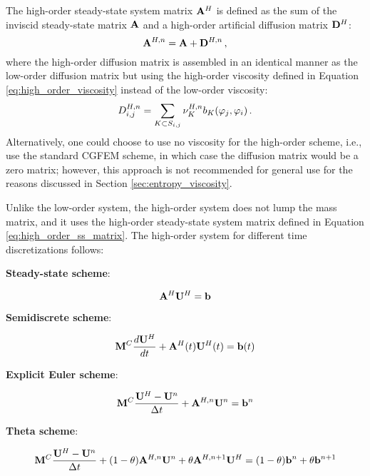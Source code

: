 The high-order steady-state system matrix $\highorderssmatrix$ is defined as
the sum of the inviscid steady-state matrix $\ssmatrix$ and a high-order
artificial diffusion matrix $\highorderdiffusionmatrix$:
\begin{equation}\label{eq:high_order_ss_matrix}
  \highorderssmatrix[\timeindex] = \ssmatrix
  + \highorderdiffusionmatrix[\timeindex] \eqc
\end{equation}
where the high-order diffusion matrix is assembled in an identical manner as
the low-order diffusion matrix but using the high-order viscosity defined in
Equation \eqref{eq:high_order_viscosity} instead of the low-order viscosity:
\begin{equation}
  \diffusionmatrixletter^{H,\timeindex}_{i,j}
  = \sumKSij\highordercellviscosity[\timeindex]
  \localviscbilinearform{\cellindex}{j}{i} \eqp
\end{equation}
Alternatively, one could choose to use no viscosity for the high-order scheme,
i.e., use the standard CGFEM scheme, in which case the diffusion matrix
would be a zero matrix; however, this approach is not recommended for general use
for the reasons discussed in Section \ref{sec:entropy_viscosity}.

Unlike the low-order system, the high-order system does not lump the
mass matrix, and it uses the high-order steady-state system matrix
defined in Equation \eqref{eq:high_order_ss_matrix}. The high-order
system for different time discretizations follows:
\begin{center}{\textbf{Steady-state scheme}:}\end{center}
\begin{equation}\label{eq:high_ss}
   \highorderssmatrix\highordersolution = \ssrhs
\end{equation}
\begin{center}{\textbf{Semidiscrete scheme}:}\end{center}
\begin{equation}\label{eq:high_semidiscrete}
   \consistentmassmatrix\ddt{\highordersolution}
    + \highorderssmatrix(\timevalue)\highordersolution(\timevalue) 
    = \ssrhs(\timevalue)
\end{equation}
\begin{center}{\textbf{Explicit Euler scheme}:}\end{center}
\begin{equation}\label{eq:high_FE}
  \consistentmassmatrix\frac{\highordersolution-\solutionvector^{\timeindex}}
  {\timestepsize}
  + \highorderssmatrix[\timeindex]\solutionvector^{\timeindex}
  = \ssrhs^\timeindex
\end{equation}
\begin{center}{\textbf{Theta scheme}:}\end{center}
\begin{equation}\label{eq:high_theta}
  \consistentmassmatrix\frac{\highordersolution-\solutionvector^\timeindex}
  {\timestepsize}
  + (1-\theta)\highorderssmatrix[\timeindex]\solutionvector^\timeindex
  + \theta\highorderssmatrix[\timeindex+1]\highordersolution
  = (1-\theta)\ssrhs^\timeindex + \theta\ssrhs^{\timeindex+1}
\end{equation}
